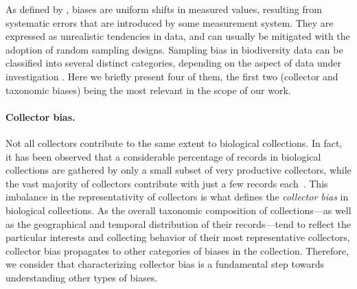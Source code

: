 As defined by , biases are uniform shifts in measured values, resulting from systematic errors that are introduced by some measurement system.
They are expressed as unrealistic tendencies in data, and can usually be mitigated with the adoption of random sampling designs.
%
Sampling bias in biodiversity data can be classified into several distinct categories, depending on the aspect of data under investigation \cite{Daru2017}.
Here we briefly present four of them, the first two (collector and taxonomic biases) being the most relevant in the scope of our work.
%
\paragraph*{Collector bias.}
Not all collectors contribute to the same extent to biological collections.
In fact, it has been observed that a considerable percentage of records in biological collections are gathered by only a small subset of very productive collectors, while the vast majority of collectors contribute with just a few records each~\cite{Daru2017,Carine2012}.
This imbalance in the representativity of collectors is what defines the \textit{collector bias} in biological collections.
As the overall taxonomic composition of collections---as well as the geographical and temporal distribution of their records---tend to reflect the particular interests and collecting behavior of their most representative collectors, collector bias propagates to other categories of biases in the collection. Therefore, we consider that characterizing collector bias is a fundamental step towards understanding other types of biases.

